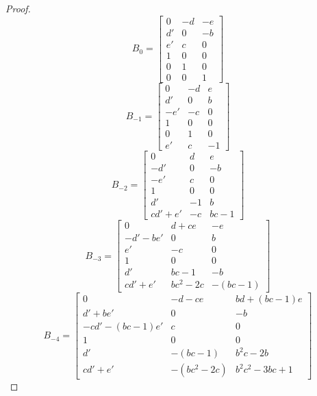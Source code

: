 \documentclass{amsart}
\numberwithin{theorem}{section}
\begin{document}
\begin{proof}
    \[B_0=\left[\begin{array}{ccc} 0 & -d & -e \\ d' & 0 & -b\\ e' & c & 0\\ 1 & 0 & 0\\ 0 & 1 & 0\\ 0 & 0 & 1\end{array}\right]\]
    \[B_{-1}=\left[\begin{array}{ccc} 0 & -d & e \\ d' & 0 & b\\ -e' & -c & 0\\ 1 & 0 & 0\\ 0 & 1 & 0\\ e' & c & -1\end{array}\right]\]
    \[B_{-2}=\left[\begin{array}{ccc} 0 & d & e \\ -d' & 0 & -b\\ -e' & c & 0\\ 1 & 0 & 0\\ d' & -1 & b\\ cd'+e' & -c & bc-1\end{array}\right]\]
    \[B_{-3}=\left[\begin{array}{ccc} 0 & d+ce & -e \\ -d'-be' & 0 & b\\ e' & -c & 0\\ 1 & 0 & 0\\ d' & bc-1 & -b\\ cd'+e' & bc^2-2c & -(bc-1)\end{array}\right]\]
    \[B_{-4}=\left[\begin{array}{ccc} 0 & -d-ce & bd+(bc-1)e \\ d'+be' & 0 & -b\\ -cd'-(bc-1)e' & c & 0\\ 1 & 0 & 0\\ d' & -(bc-1) & b^2c-2b\\ cd'+e' & -(bc^2-2c) & b^2c^2-3bc+1\end{array}\right]\]

  \end{proof}
\end{document}
